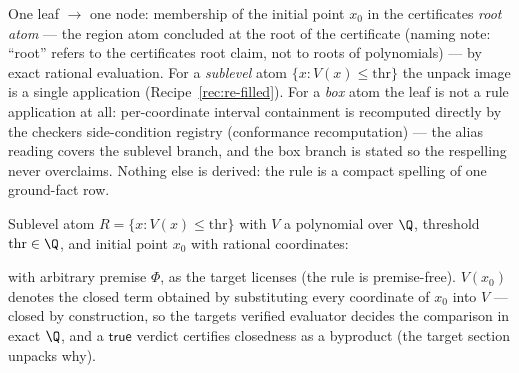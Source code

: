 

\begin{brecipe}\label{rec:re-template}
One leaf $\to$ one node: membership of the initial point $x_0$ in the
certificate\textquotesingle s \emph{root atom} --- the region atom
concluded at the root of the certificate (naming note: ``root'' refers
to the certificate\textquotesingle s root claim, not to roots of
polynomials) --- by exact rational evaluation. For a \emph{sublevel}
atom $\{x : V(x) \le \mathrm{thr}\}$ the unpack image is a single
 application
(Recipe~\ref{rec:re-filled}). For a \emph{box} atom the leaf is not a
rule application at all: per-coordinate interval containment is
recomputed directly by the checker\textquotesingle s side-condition
registry (conformance recomputation) --- the alias reading covers the
sublevel branch, and the box branch is stated so the respelling never
overclaims. Nothing else is derived: the rule is a compact spelling of
one ground-fact row.
\end{brecipe}

\begin{brecipe}\label{rec:re-filled}
Sublevel atom $R = \{x : V(x) \le \mathrm{thr}\}$ with $V$ a polynomial
over $\Q$, threshold $\mathrm{thr} \in \Q$, and initial point
$x_0$ with rational coordinates:
\begin{mathpar}
\end{mathpar}
with arbitrary premise $\Phi$, as the target licenses (the rule is
premise-free). $V(x_0)$ denotes the closed term obtained by
substituting every coordinate of $x_0$ into $V$ --- closed by
construction, so the target\textquotesingle s verified evaluator
decides the comparison in exact $\Q$, and a $\mathsf{true}$ verdict
certifies closedness as a byproduct (the target section unpacks why).
\end{brecipe}

